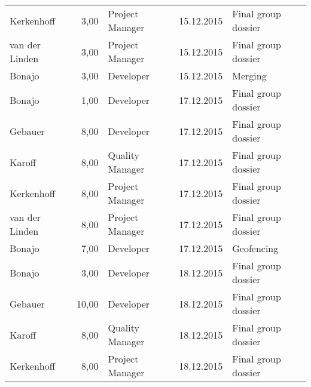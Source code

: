 \begin{longtable}{ l r p{2cm} c p{4cm} }
		Kerkenhoff              & 3,00           & Project Manager & 15.12.2015    & Final group dossier                                                             \\
		van der Linden          & 3,00           & Project Manager & 15.12.2015    & Final group dossier                                                             \\
		Bonajo                  & 3,00           & Developer       & 15.12.2015    & Merging                                                                         \\
		Bonajo                  & 1,00           & Developer       & 17.12.2015    & Final group dossier                                                             \\
		Gebauer                 & 8,00           & Developer       & 17.12.2015    & Final group dossier                                                             \\
		Karoff                  & 8,00           & Quality Manager & 17.12.2015    & Final group dossier                                                             \\
		Kerkenhoff              & 8,00           & Project Manager & 17.12.2015    & Final group dossier                                                             \\
		van der Linden          & 8,00           & Project Manager & 17.12.2015    & Final group dossier                                                             \\
		Bonajo                  & 7,00           & Developer       & 17.12.2015    & Geofencing                                                                      \\
		Bonajo                  & 3,00           & Developer       & 18.12.2015    & Final group dossier                                                             \\
		Gebauer                 & 10,00          & Developer       & 18.12.2015    & Final group dossier                                                             \\
		Karoff                  & 8,00           & Quality Manager & 18.12.2015    & Final group dossier                                                             \\
		Kerkenhoff              & 8,00           & Project Manager & 18.12.2015    & Final group dossier                                                             \\

\end{longtable}
